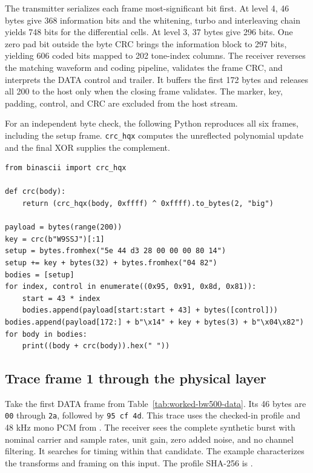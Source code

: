 
The transmitter serializes each frame most-significant bit first. At
level 4, 46 bytes give 368 information bits and the whitening, turbo and
interleaving chain yields 748 bits for the differential cells. At level 3,
37 bytes give 296 bits. One zero pad bit outside the byte CRC brings the
information block to 297 bits, yielding 606 coded bits mapped to 202 tone-index
columns. The receiver reverses the matching waveform and coding pipeline,
validates the frame CRC, and interprets the DATA control and trailer.
It buffers the first 172 bytes and releases all 200 to the host only when
the closing frame validates. The marker, key, padding, control, and CRC
are excluded from the host stream.

For an independent byte check, the following Python reproduces all six
frames, including the setup frame. \texttt{crc\_hqx} computes the
unreflected polynomial update and the final XOR supplies the complement.
\begin{verbatim}
from binascii import crc_hqx

def crc(body):
    return (crc_hqx(body, 0xffff) ^ 0xffff).to_bytes(2, "big")

payload = bytes(range(200))
key = crc(b"W9SSJ")[:1]
setup = bytes.fromhex("5e 44 d3 28 00 00 00 80 14")
setup += key + bytes(32) + bytes.fromhex("04 82")
bodies = [setup]
for index, control in enumerate((0x95, 0x91, 0x8d, 0x81)):
    start = 43 * index
    bodies.append(payload[start:start + 43] + bytes([control]))
bodies.append(payload[172:] + b"\x14" + key + bytes(3) + b"\x04\x82")
for body in bodies:
    print((body + crc(body)).hex(" "))
\end{verbatim}

\subsection{Trace frame 1 through the physical layer}
\label{sec:worked-bw500-phy}

Take the first DATA frame from Table~\ref{tab:worked-bw500-data}.
Its 46 bytes are \texttt{00} through \texttt{2a}, followed by
\texttt{95 cf 4d}. This trace uses the checked-in
 profile and
48 kHz mono PCM from .
The receiver sees the complete synthetic burst with nominal carrier and
sample rates, unit gain, zero added noise, and no channel filtering.
It searches for timing within that candidate. The example characterizes
the transforms and framing on this input. The profile SHA-256 is
.

